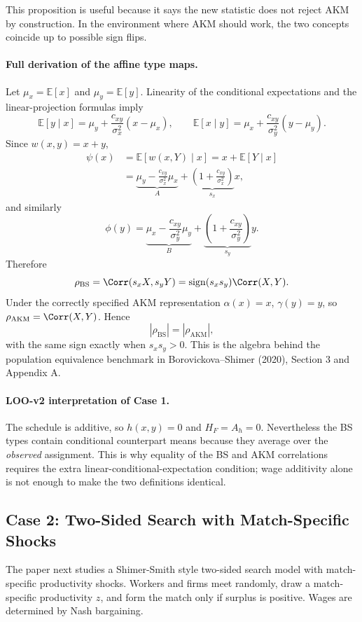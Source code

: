 \documentclass[11pt]{article}
\newcommand{\E}{\mathbb{E}}
\begin{document}
This proposition is useful because it says the new statistic does not reject AKM by construction. In the environment where AKM should work, the two concepts coincide up to possible sign flips.

\paragraph{Full derivation of the affine type maps.}
Let \(\mu_x=\E[x]\) and \(\mu_y=\E[y]\).  Linearity of the conditional
expectations and the linear-projection formulas imply
\[
\E[y\mid x]
=
\mu_y+\frac{c_{xy}}{\sigma_x^2}(x-\mu_x),
\qquad
\E[x\mid y]
=
\mu_x+\frac{c_{xy}}{\sigma_y^2}(y-\mu_y).
\]
Since \(w(x,y)=x+y\),
\begin{align*}
\psi(x)
&=\E[w(x,Y)\mid x]
=x+\E[Y\mid x]\\
&=\underbrace{\mu_y-
\frac{c_{xy}}{\sigma_x^2}\mu_x}_{A}
+\underbrace{\left(1+
\frac{c_{xy}}{\sigma_x^2}\right)}_{s_x}x,
\end{align*}
and similarly
\[
\phi(y)
=
\underbrace{\mu_x-
\frac{c_{xy}}{\sigma_y^2}\mu_y}_{B}
+\underbrace{\left(1+
\frac{c_{xy}}{\sigma_y^2}\right)}_{s_y}y.
\]
Therefore
\[
\rho_{\mathrm{BS}}
=
\Corr(s_xX,s_yY)
=
\operatorname{sign}(s_xs_y)\Corr(X,Y).
\]
Under the correctly specified AKM representation
\(\alpha(x)=x\), \(\gamma(y)=y\), so
\(\rho_{\mathrm{AKM}}=\Corr(X,Y)\).  Hence
\[
|\rho_{\mathrm{BS}}|=|\rho_{\mathrm{AKM}}|,
\]
with the same sign exactly when \(s_xs_y>0\).  This is the algebra behind the
population equivalence benchmark in Borovickova--Shimer (2020), Section 3 and
Appendix A.

\paragraph{LOO-v2 interpretation of Case 1.}
The schedule is additive, so \(h(x,y)=0\) and \(H_F=A_h=0\).  Nevertheless the
BS types contain conditional counterpart means because they average over the
\emph{observed} assignment.  This is why equality of the BS and AKM
correlations requires the extra linear-conditional-expectation condition; wage
additivity alone is not enough to make the two definitions identical.

\subsection{Case 2: Two-Sided Search with Match-Specific Shocks}

The paper next studies a Shimer-Smith style two-sided search model with match-specific productivity shocks. Workers and firms meet randomly, draw a match-specific productivity $z$, and form the match only if surplus is positive. Wages are determined by Nash bargaining.
\end{document}
